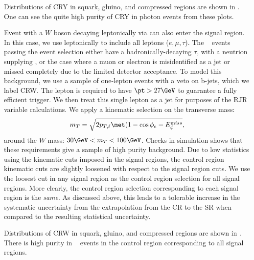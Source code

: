 Distributions of CRY in squark, gluino, and compressed regions are shown in .
One can see the quite high purity of CRY in photon events from these plots.

Event with a $W$ boson decaying leptonically via \wln can also enter the signal region.
In this case, we use leptonically to include all leptons ($e,\mu,\tau$).
The \wjets~ events passing the event selection either have a hadronically-decaying $\tau$, with a neutrion supplying \met, or the case where a muon or electron is misidentified as a jet or missed completely due to the limited detector acceptance.
To model this background, we use a sample of one-lepton events with a veto on b-jets, which we label CRW.
The lepton is required to have $\pt > 27 \GeV$ to guarantee a fully efficient trigger.
We then treat this single lepton as a jet for purposes of the RJR variable calculations.
We apply a kinematic selection on the transverse mass:
\begin{align}
m_T = \sqrt{2p_{T,\ell} \met ( 1 - \cos{ \phi_{e} - \metphi } },
\end{align}
around the $W$ mass: $30 \GeV < m_T < 100 \GeV$.
Checks in simulation shows that these requirements give a sample of high purity \wln background.
Due to low statistics using the kinematic cuts imposed in the signal regions, the control region kinematic cuts are slightly loosened with respect to the signal region cuts.
We use the loosest cut in any signal region as the control region selection for all signal regions.
More clearly, the control region selection corresponding to each signal region is the \textit{same}.
As discussed above, this leads to a tolerable increase in the systematic uncertainty from the extrapolation from the CR to the SR when compared to the resulting statistical uncertainty.

Distributions of CRW in squark, gluino, and compressed regions are shown in .
There is high purity in \wjets~ events in the control region corresponding to all signal regions.

